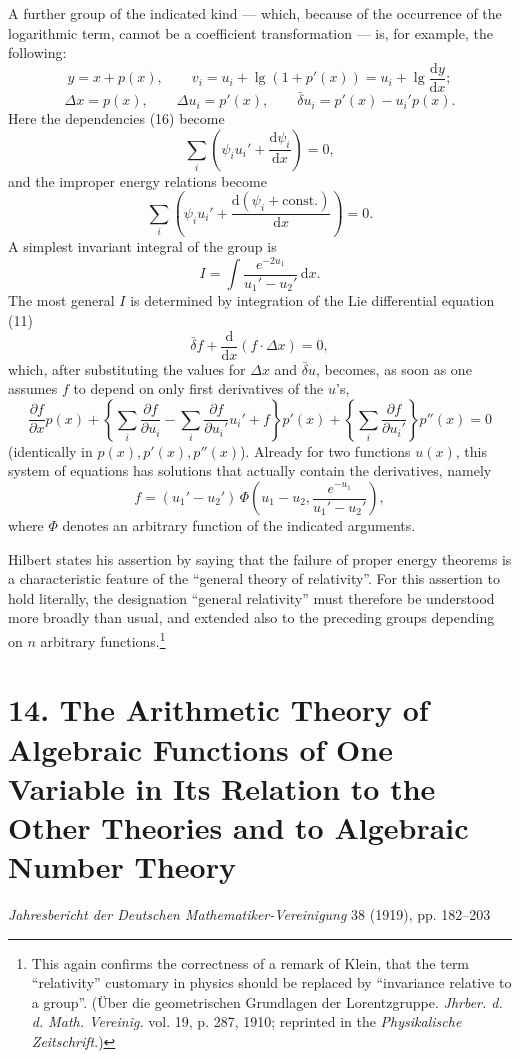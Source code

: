 \documentclass[11pt]{article}
\newcommand{\D}{\Delta}
\providecommand{\dd}{\mathrm d}
\providecommand{\bd}{\bar{\delta}}
\providecommand{\p}{\partial}
\providecommand{\p}{\partial}
\providecommand{\dd}{\mathrm d}
\begin{document}
A further group of the indicated kind --- which, because of the occurrence of the logarithmic term, cannot be a coefficient transformation --- is, for example, the following:
\[
y=x+p(x),\qquad
v_i=u_i+\lg(1+p'(x))=u_i+\lg\frac{\dd y}{\dd x};
\]
\[
\D x=p(x),\qquad
\D u_i=p'(x),\qquad
\bd u_i=p'(x)-u_i'p(x).
\]
Here the dependencies (16) become
\[
\sum_i\left(\psi_i u_i'+\frac{\dd\psi_i}{\dd x}\right)=0,
\]
and the improper energy relations become
\[
\sum_i\left(\psi_i u_i'+
\frac{\dd(\psi_i+\mathrm{const.})}{\dd x}\right)=0.
\]
A simplest invariant integral of the group is
\[
I=\int \frac{e^{-2u_1}}{u_1'-u_2'}\,\dd x.
\]
The most general \(I\) is determined by integration of the Lie differential equation (11)
\[
\bd f+\frac{\dd}{\dd x}(f\cdot \D x)=0,
\]
which, after substituting the values for \(\D x\) and \(\bd u\), becomes, as soon as one assumes \(f\) to depend on only first derivatives of the \(u\)'s,
\[
\frac{\p f}{\p x}p(x)
+\left\{\sum_i\frac{\p f}{\p u_i}
-\sum_i\frac{\p f}{\p u_i'}u_i'+f\right\}p'(x)
+\left\{\sum_i\frac{\p f}{\p u_i'}\right\}p''(x)=0
\]
(identically in \(p(x),p'(x),p''(x)\)). Already for two functions \(u(x)\), this system of equations has solutions that actually contain the derivatives, namely
\[
f=(u_1'-u_2')\,
\Phi\!\left(u_1-u_2,\frac{e^{-u_1}}{u_1'-u_2'}\right),
\]
where \(\Phi\) denotes an arbitrary function of the indicated arguments.

Hilbert states his assertion by saying that the failure of proper energy theorems is a characteristic feature of the ``general theory of relativity''. For this assertion to hold literally, the designation ``general relativity'' must therefore be understood more broadly than usual, and extended also to the preceding groups depending on \(n\) arbitrary functions.\footnote{This again confirms the correctness of a remark of Klein, that the term ``relativity'' customary in physics should be replaced by ``invariance relative to a group''. (Über die geometrischen Grundlagen der Lorentzgruppe. \emph{Jhrber. d. d. Math. Vereinig.} vol. 19, p. 287, 1910; reprinted in the \emph{Physikalische Zeitschrift}.)}


\section*{14. The Arithmetic Theory of Algebraic Functions of One Variable in Its Relation to the Other Theories and to Algebraic Number Theory}
\begin{center}
\emph{Jahresbericht der Deutschen Mathematiker-Vereinigung} 38 (1919), pp. 182--203
\end{center}
\end{document}
